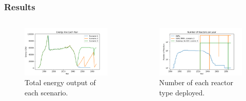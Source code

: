 \begin{frame}
\frametitle{Results}
    \begin{columns}
      \column[t]{5cm}
      \begin{figure}[t!]
          \includegraphics[scale=0.25, trim=0 5 0 10,clip]{figures/energy_all.png}
          \caption{Total energy output of each scenario.}
          \label{fig:energy}
      \end{figure}
      \begin{figure}[h]
          \includegraphics[scale=0.25, trim=0 5 0 10,clip]{figures/rx_deployment_all.png}
          \caption{Number of each reactor type deployed.}
          \label{fig:ex_deployment}
      \end{figure}
  

\end{columns}
\end{frame}
